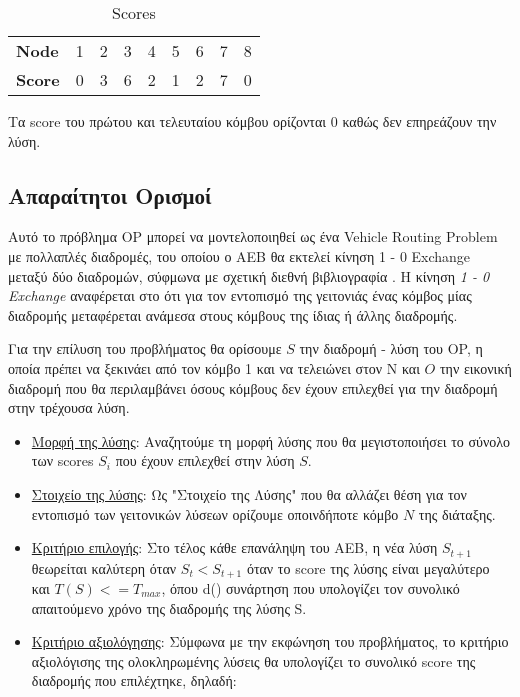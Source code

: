 \documentclass[12pt, a4paper]{article}
\begin{document}
\begin{table}[H]
\centering
\begin{tabular}{l|l|l|l|l|l|l|l|l|}
\cline{2-9}
\textbf{Node}  & 1 & 2 & 3 & 4 & 5 & 6 & 7 & 8 \\ \cline{2-9} 
\textbf{Score} & 0 & 3 & 6 & 2 & 1 & 2 & 7 & 0 \\ \cline{2-9} 
\end{tabular}
\caption{Scores}
\label{my-label}
\end{table}

Τα score του πρώτου και τελευταίου κόμβου ορίζονται 0 καθώς δεν επηρεάζουν την λύση.

\subsection{Απαραίτητοι Ορισμοί}

Αυτό το πρόβλημα OP μπορεί να μοντελοποιηθεί ως ένα Vehicle Routing Problem με πολλαπλές διαδρομές, του οποίου ο ΑΕΒ θα εκτελεί κίνηση 1 - 0 Exchange μεταξύ δύο διαδρομών, σύφμωνα με σχετική διεθνή βιβλιογραφία \cite{tarantilis2002distribution}. Η κίνηση \textit{1 - 0 Exchange} αναφέρεται στο ότι για τον εντοπισμό της γειτονιάς ένας κόμβος μίας διαδρομής μεταφέρεται ανάμεσα στους κόμβους της ίδιας ή άλλης διαδρομής.

Για την επίλυση του προβλήματος θα ορίσουμε \(S\) την διαδρομή - λύση του OP, η οποία πρέπει να ξεκινάει από τον κόμβο 1 και να τελειώνει στον Ν και \(O\) την εικονική διαδρομή που θα περιλαμβάνει όσους κόμβους δεν έχουν επιλεχθεί για την διαδρομή στην τρέχουσα λύση.

\begin{itemize}

\item \underline{Μορφή της λύσης}: Αναζητούμε τη μορφή λύσης που θα μεγιστοποιήσει το σύνολο των scores \(S_i\) που έχουν επιλεχθεί στην λύση \(S\).
\item \underline{Στοιχείο της λύσης}: Ως "Στοιχείο της Λύσης" που θα αλλάζει θέση για τον εντοπισμό των γειτονικών λύσεων ορίζουμε οποινδήποτε κόμβο \(N\) της διάταξης.
\item \underline{Κριτήριο επιλογής}: Στο τέλος κάθε επανάληψη του ΑΕΒ,  η νέα λύση \(S_{t+1}\) θεωρείται καλύτερη όταν \(S_t < S_{t+1}\) όταν το score της λύσης είναι μεγαλύτερο και \(T(S) <= T_{max}\), όπου d() συνάρτηση που υπολογίζει τον συνολικό απαιτούμενο χρόνο της διαδρομής της λύσης S.
\item \underline{Κριτήριο αξιολόγησης}: Σύμφωνα με την εκφώνηση του προβλήματος, το κριτήριο αξιολόγισης της ολοκληρωμένης λύσεις θα υπολογίζει το συνολικό score της διαδρομής που επιλέχτηκε, δηλαδή:

\end{itemize}
\end{document}
